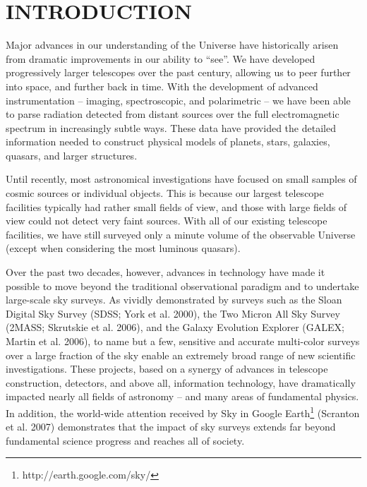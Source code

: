 \documentclass{emulateapj}
\begin{document}






\section{INTRODUCTION}
 

Major advances in our understanding of the Universe have historically arisen
from dramatic improvements in our ability to ``see''. We have developed
progressively larger telescopes over the past century, allowing us 
to peer further into space, and further back in time. With the development of 
advanced instrumentation -- imaging, spectroscopic, and polarimetric -- we 
have been able to parse radiation detected from distant sources over the 
full electromagnetic spectrum in increasingly subtle ways. 
These data have provided the detailed information needed to construct physical 
models of planets, stars, galaxies, quasars, and larger structures. 

Until recently, most astronomical investigations have focused on small samples 
of cosmic sources or individual objects. This is because our largest telescope 
facilities typically had rather small fields of view, and those with large
fields of view could not detect very faint sources. With all of our existing 
telescope facilities, we have still surveyed only a minute volume of the 
observable Universe (except when considering the most luminous quasars). 

Over the past two decades, however, advances in technology have made it possible to 
move beyond the traditional observational paradigm and to undertake large-scale 
sky surveys. As vividly demonstrated by surveys such as the Sloan Digital Sky 
Survey (SDSS; York et al. 2000), the Two Micron All Sky Survey (2MASS;
Skrutskie et al. 2006), and the Galaxy Evolution Explorer (GALEX; Martin et
al. 2006), to name but a few, sensitive and accurate 
multi-color surveys over a large fraction of the sky enable an extremely broad range of 
new scientific investigations. These projects, based on a synergy of advances in 
telescope construction, detectors, and above all, information technology, 
have dramatically impacted nearly all fields of astronomy 
-- and many areas of fundamental physics. In addition, the world-wide attention 
received by Sky in Google Earth\footnote{http://earth.google.com/sky/} (Scranton et al. 2007) 
demonstrates that the impact of sky surveys extends
far beyond fundamental science progress and reaches all of society.
\end{document}
